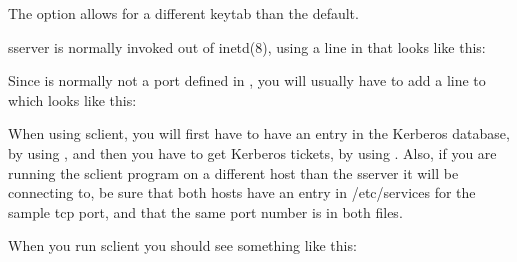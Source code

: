 \documentclass[letterpaper,10pt,english]{sphinxmanual}
\begin{document}
\sphinxAtStartPar
The  option allows for a different keytab than the default.

\sphinxAtStartPar
sserver is normally invoked out of inetd(8), using a line in
 that looks like this:

\begin{sphinxVerbatim}[commandchars=\\\{\}]
      
\end{sphinxVerbatim}

\sphinxAtStartPar
Since  is normally not a port defined in ,
you will usually have to add a line to  which looks
like this:

\begin{sphinxVerbatim}[commandchars=\\\{\}]
          
\end{sphinxVerbatim}

\sphinxAtStartPar
When using sclient, you will first have to have an entry in the
Kerberos database, by using {\hyperref[\detokenize{admin/admin_commands/kadmin_local:kadmin-1}]{}}, and then you have to get
Kerberos tickets, by using .  Also, if you are running
the sclient program on a different host than the sserver it will be
connecting to, be sure that both hosts have an entry in /etc/services
for the sample tcp port, and that the same port number is in both
files.

\sphinxAtStartPar
When you run sclient you should see something like this:

\begin{sphinxVerbatim}[commandchars=\\\{\}]
   
   
  
\end{sphinxVerbatim}
\end{document}
